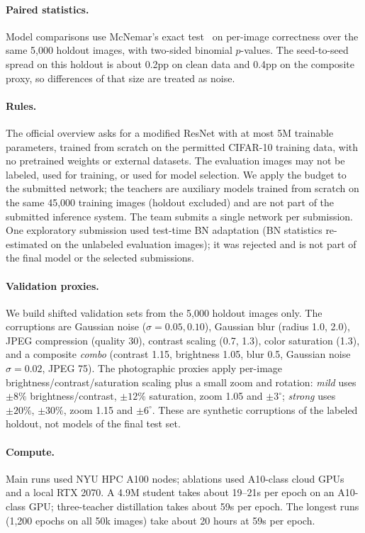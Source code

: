 \paragraph{Paired statistics.}
Model comparisons use McNemar's exact test~\citep{mcnemar1947} on per-image correctness over the same
5,000 holdout images, with two-sided binomial $p$-values. The seed-to-seed spread on this holdout is about 0.2pp on clean data
and 0.4pp on the composite proxy, so differences of that size are treated as
noise.

\paragraph{Rules.}
The official overview asks for a modified ResNet with at most 5M trainable
parameters, trained from scratch on the permitted CIFAR-10 training data, with no
pretrained weights or external datasets. The evaluation images may not be
labeled, used for training, or used for model selection. We apply the budget to
the submitted network; the teachers are auxiliary models trained from scratch on
the same 45,000 training images (holdout excluded) and are not part of the submitted inference system. The
team submits a single network per submission. One exploratory submission used test-time BN adaptation (BN statistics re-estimated on the unlabeled evaluation images); it was rejected and is not part of the final model or the selected submissions.

\paragraph{Validation proxies.}
We build shifted validation sets from the 5,000 holdout images only. The
corruptions are Gaussian noise ($\sigma=0.05,0.10$), Gaussian blur (radius 1.0,
2.0), JPEG compression (quality 30), contrast scaling (0.7, 1.3), color
saturation (1.3), and a composite \emph{combo} (contrast 1.15, brightness 1.05,
blur 0.5, Gaussian noise $\sigma=0.02$, JPEG 75). The photographic proxies apply
per-image brightness/contrast/saturation scaling plus a small zoom and rotation:
\emph{mild} uses $\pm8\%$ brightness/contrast, $\pm12\%$ saturation, zoom 1.05 and
$\pm3^\circ$; \emph{strong} uses $\pm20\%$, $\pm30\%$, zoom 1.15 and $\pm6^\circ$.
These are synthetic corruptions of the labeled holdout, not models of the
final test set.

\paragraph{Compute.}
Main runs used NYU HPC A100 nodes; ablations used A10-class cloud GPUs and a local
RTX 2070. A 4.9M student takes about 19--21s per epoch on an A10-class GPU;
three-teacher distillation takes about 59s per epoch. The longest runs (1,200
epochs on all 50k images) take about 20 hours at 59s per epoch.
